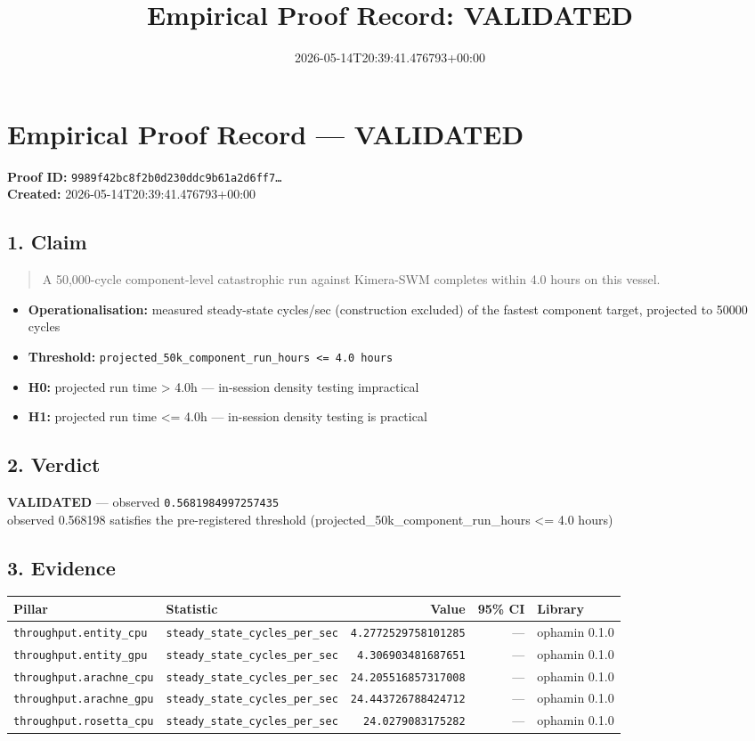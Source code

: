 \documentclass{article}
\title{Empirical Proof Record: VALIDATED}
\date{2026-05-14T20:39:41.476793+00:00}
\begin{document}
\maketitle
\section*{Empirical Proof Record --- \textcolor{validated}{\textbf{VALIDATED}}}
\textbf{Proof ID:} \texttt{9989f42bc8f2b0d230ddc9b61a2d6ff7\dots}\\
\textbf{Created:} 2026-05-14T20:39:41.476793+00:00
\subsection*{1. Claim}
\begin{quote}A 50,000-cycle component-level catastrophic run against Kimera-SWM completes within 4.0 hours on this vessel.\end{quote}
\begin{itemize}
\item \textbf{Operationalisation:} measured steady-state cycles/sec (construction excluded) of the fastest component target, projected to 50000 cycles
\item \textbf{Threshold:} \texttt{projected\_50k\_component\_run\_hours <= 4.0 hours}
\item \textbf{H0:} projected run time > 4.0h — in-session density testing impractical
\item \textbf{H1:} projected run time <= 4.0h — in-session density testing is practical
\end{itemize}
\subsection*{2. Verdict}
\textcolor{validated}{\textbf{VALIDATED}} --- observed \texttt{0.5681984997257435}\\
observed 0.568198 satisfies the pre-registered threshold (projected\_50k\_component\_run\_hours <= 4.0 hours)
\subsection*{3. Evidence}
\begin{tabular}{llrrl}\toprule
\textbf{Pillar} & \textbf{Statistic} & \textbf{Value} & \textbf{95\% CI} & \textbf{Library} \\\midrule
\texttt{throughput.entity\_cpu} & \texttt{steady\_state\_cycles\_per\_sec} & \texttt{4.2772529758101285} & --- & ophamin 0.1.0 \\
\texttt{throughput.entity\_gpu} & \texttt{steady\_state\_cycles\_per\_sec} & \texttt{4.306903481687651} & --- & ophamin 0.1.0 \\
\texttt{throughput.arachne\_cpu} & \texttt{steady\_state\_cycles\_per\_sec} & \texttt{24.205516857317008} & --- & ophamin 0.1.0 \\
\texttt{throughput.arachne\_gpu} & \texttt{steady\_state\_cycles\_per\_sec} & \texttt{24.443726788424712} & --- & ophamin 0.1.0 \\
\texttt{throughput.rosetta\_cpu} & \texttt{steady\_state\_cycles\_per\_sec} & \texttt{24.0279083175282} & --- & ophamin 0.1.0 \\
\bottomrule\end{tabular}
\end{document}
